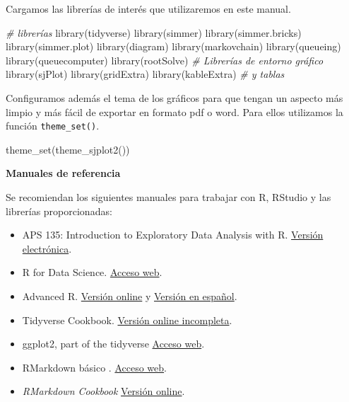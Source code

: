 \documentclass[
]{book}
\newenvironment{Shaded}{\begin{snugshade}}{\end{snugshade}}
\newcommand{\CommentTok}[1]{\textcolor[rgb]{0.56,0.35,0.01}{\textit{#1}}}
\newcommand{\FunctionTok}[1]{\textcolor[rgb]{0.00,0.00,0.00}{#1}}
\newcommand{\NormalTok}[1]{#1}
\theoremstyle{definition}
\theoremstyle{definition}
\theoremstyle{definition}
\theoremstyle{definition}
\theoremstyle{remark}
\begin{document}
Cargamos las librerías de interés que utilizaremos en este manual.

\begin{Shaded}
\begin{Highlighting}[]
\CommentTok{\# librerías}
\FunctionTok{library}\NormalTok{(tidyverse)}
\FunctionTok{library}\NormalTok{(simmer)}
\FunctionTok{library}\NormalTok{(simmer.bricks)}
\FunctionTok{library}\NormalTok{(simmer.plot)}
\FunctionTok{library}\NormalTok{(diagram)}
\FunctionTok{library}\NormalTok{(markovchain)}
\FunctionTok{library}\NormalTok{(queueing)}
\FunctionTok{library}\NormalTok{(queuecomputer)}
\FunctionTok{library}\NormalTok{(rootSolve)}
\CommentTok{\# Librerías de entorno gráfico}
\FunctionTok{library}\NormalTok{(sjPlot)}
\FunctionTok{library}\NormalTok{(gridExtra)}
\FunctionTok{library}\NormalTok{(kableExtra)  }\CommentTok{\# y tablas}
\end{Highlighting}
\end{Shaded}

Configuramos además el tema de los gráficos para que tengan un aspecto más limpio y más fácil de exportar en formato pdf o word. Para ellos utilizamos la función \texttt{theme\_set()}.

\begin{Shaded}
\begin{Highlighting}[]
\FunctionTok{theme\_set}\NormalTok{(}\FunctionTok{theme\_sjplot2}\NormalTok{())}
\end{Highlighting}
\end{Shaded}

\textbf{Manuales de referencia}

Se recomiendan los siguientes manuales para trabajar con R, RStudio y las librerías proporcionadas:

\begin{itemize}
\item
  APS 135: Introduction to Exploratory Data Analysis with R. \citep{childs19} \href{https://dzchilds.github.io/eda-for-bio/}{Versión electrónica}.
\item
  R for Data Science. \citep{wickham-grolemund} \href{http://r4ds.had.co.nz/}{Acceso web}.
\item
  Advanced R. \citep{advanced-R} \href{https://adv-r.hadley.nz/}{Versión online} y \href{https://es.r4ds.hadley.nz/}{Versión en español}.
\item
  Tidyverse Cookbook. \citep{grosser18} \href{https://bookdown.org/Tazinho/Tidyverse-Cookbook/}{Versión online incompleta}.
\item
  ggplot2, part of the tidyverse \citep{R-ggplot2} \href{https://ggplot2.tidyverse.org/}{Acceso web}.
\item
  RMarkdown básico \citep{Goicoa17}. \href{http://www.unavarra.es/personal/tgoicoa/ESTADISTICA_RMarkdown_tomas/basicRmarkdown/index.html}{Acceso web}.
\item
  \emph{RMarkdown Cookbook} \citep{rmarkdown2020} \href{https://bookdown.org/yihui/rmarkdown-cookbook}{Versión online}.
\end{itemize}
\end{document}
